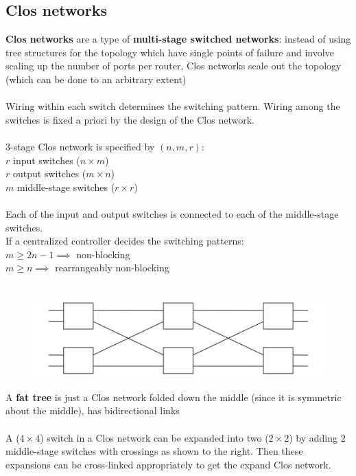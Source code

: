 \documentclass{article}
\begin{document}
\subsection{Clos networks}

\textbf{Clos networks} are a type of \textbf{multi-stage switched networks}: instead of using tree structures for the topology which have single points of failure and involve scaling up the number of ports per router, Clos networks scale out the topology (which can be done to an arbitrary extent) \\
\\
Wiring within each switch determines the switching pattern. Wiring among the switches is fixed a priori by the design of the Clos network. \\
\\
3-stage Clos network is specified by $(n, m, r)$: \\
$r$ input switches ($n \times m$) \\
$r$ output switches ($m \times n$) \\
$m$ middle-stage switches ($r \times r$) \\
\\
Each of the input and output switches is connected to each of the middle-stage switches. \\
If a centralized controller decides the switching patterns: \\
$m \geq 2n - 1 \implies$ non-blocking \\
$m \geq n \implies$ rearrangeably non-blocking \\
\\
\begin{figure}
\includegraphics[width=\linewidth]{4x4as2x2.png}
\end{figure}
A \textbf{fat tree} is just a Clos network folded down the middle (since it is symmetric about the middle), has bidirectional links \\
\\
A ($4 \times 4$) switch in a Clos network can be expanded into two ($2 \times 2$) by adding 2 middle-stage switches with crossings as shown to the right. Then these expansions can be cross-linked appropriately to get the expand Clos network.
\end{document}
